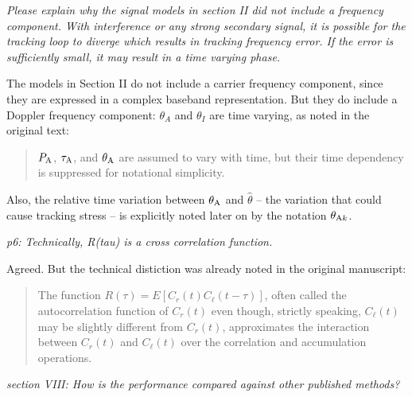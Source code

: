 \documentclass[12pt]{report}
\begin{document}
{\textit{Please explain why the signal models in section II did not
      include a frequency component. With interference or any strong secondary
      signal, it is possible for the tracking loop to diverge which results in
      tracking frequency error. If the error is sufficiently small, it may
      result in a time varying phase.}}

  
   The models in Section II do not include a carrier frequency component,
    since they are expressed in a complex baseband representation.  But they
    do include a Doppler frequency component: $\theta_A$ and $\theta_I$ are
    time varying, as noted in the original text:
    \begin{quotation}
      $P_{\rm A}$, $\tau_{\rm A}$, and $\theta_{\rm A}$ are assumed to vary
      with time, but their time dependency is suppressed for notational
      simplicity.
    \end{quotation}
    Also, the relative time variation between $\theta_{\rm A}$ and
    $\hat{\theta}$ -- the variation that could cause tracking stress -- is
    explicitly noted later on by the notation $\theta_{{\rm A}k}$.
  

{\textit{p6: Technically, R(tau) is a cross correlation function.}}
  
  {{Agreed.  But the technical distiction was already noted in the
        original manuscript:}}
    \begin{quotation}
      The function $R(\tau) = E[C_r(t)C_{\ell}(t - \tau)]$, often called the
      autocorrelation function of $C_r(t)$ even though, strictly speaking,
      $C_{\ell}(t)$ may be slightly different from $C_r(t)$, approximates the
      interaction between $C_r(t)$ and $C_{\ell}(t)$ over the correlation and
      accumulation operations.
    \end{quotation}    
  
  
{\textit{section VIII: How is the performance compared against
      other published methods?}}
\end{document}
